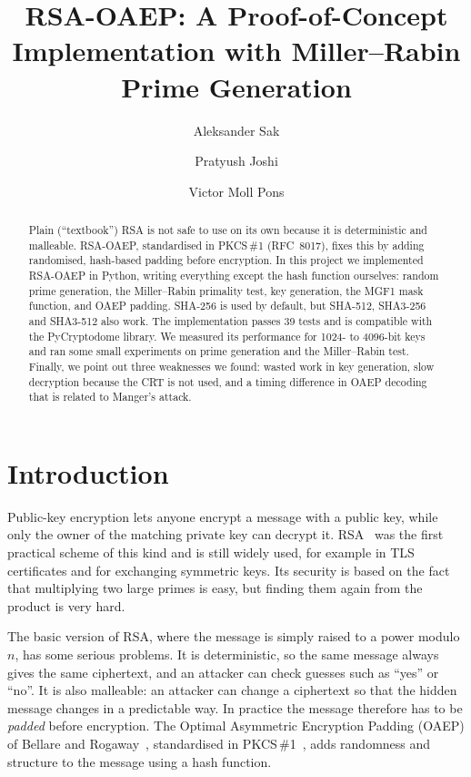 \documentclass[runningheads]{llncs}
\begin{document}
\title{RSA-OAEP: A Proof-of-Concept Implementation with Miller--Rabin
Prime Generation}

\author{Aleksander Sak \and Pratyush Joshi \and Victor Moll Pons}

\maketitle

\begin{abstract}
Plain (``textbook'') RSA is not safe to use on its own because it is
deterministic and malleable. RSA-OAEP, standardised in PKCS\,\#1 (RFC~8017),
fixes this by adding randomised, hash-based padding before encryption. In
this project we implemented RSA-OAEP in Python, writing everything except
the hash function ourselves: random prime generation, the Miller--Rabin
primality test, key generation, the MGF1 mask function, and OAEP padding.
SHA-256 is used by default, but SHA-512, SHA3-256 and SHA3-512 also work.
The implementation passes 39 tests and is compatible with the PyCryptodome
library. We measured its performance for 1024- to 4096-bit keys and ran some
small experiments on prime generation and the Miller--Rabin test. Finally,
we point out three weaknesses we found: wasted work in key generation, slow
decryption because the CRT is not used, and a timing difference in OAEP
decoding that is related to Manger's attack.
\end{abstract}

\section{Introduction}

Public-key encryption lets anyone encrypt a message with a public key, while
only the owner of the matching private key can decrypt it. RSA~\cite{rsa1978}
was the first practical scheme of this kind and is still widely used, for
example in TLS certificates and for exchanging symmetric keys. Its security
is based on the fact that multiplying two large primes is easy, but finding
them again from the product is very hard.

The basic version of RSA, where the message is simply raised to a power
modulo $n$, has some serious problems. It is deterministic, so the same
message always gives the same ciphertext, and an attacker can check guesses
such as ``yes'' or ``no''. It is also malleable: an attacker can change a
ciphertext so that the hidden message changes in a predictable way. In
practice the message therefore has to be \emph{padded} before encryption.
The Optimal Asymmetric Encryption Padding (OAEP) of Bellare and
Rogaway~\cite{bellareRogaway1994}, standardised in PKCS\,\#1~\cite{rfc8017},
adds randomness and structure to the message using a hash function.
\end{document}
